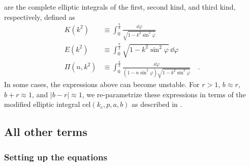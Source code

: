 \documentclass[modern]{aastex61}
\begin{document}
are the complete elliptic integrals of the first, second kind, and third kind,
respectively, defined as
%
\begin{align}
    \label{eq:elliptic}
    K(k^2) &\equiv \int_0^{\frac{\pi}{2}} \frac{\dd \varphi}{\sqrt{1 - k^2 \sin^2 \varphi}}
    \nonumber \\[0.5em]
    E(k^2) &\equiv \int_0^{\frac{\pi}{2}} \sqrt{1 - k^2 \sin^2 \varphi} \, \dd \varphi
    \nonumber \\[0.5em]
    \Pi(n, k^2) &\equiv \int_0^{\frac{\pi}{2}} \frac{\dd \varphi}{(1 - n \sin^2 \varphi)\sqrt{1 - k^2 \sin^2 \varphi}}
    \quad.
\end{align}
%
In some cases, the expressions above can become unstable. For $r > 1$,
$b \approx r$, $b + r \approx 1$, and $|b - r| \approx 1$, we re-parametrize
these expressions in terms of the modified elliptic integral
$\mathrm{cel}(k_c, p, a, b)$ \citep{Bulirsch1969} as described in
\citet{limbdark}.

\subsection{All other terms}
\label{app:generalterm}

\subsubsection{Setting up the equations}
\label{app:generaltermsetup}
\end{document}
